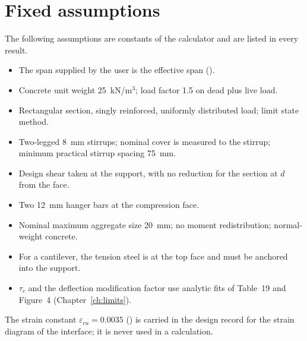 \section{Fixed assumptions}
The following assumptions are constants of the calculator and are listed in every result.
\begin{itemize}
  \item The span supplied by the user is the effective span ().
  \item Concrete unit weight 25~kN/m$^3$; load factor 1.5 on dead plus live load.
  \item Rectangular section, singly reinforced, uniformly distributed load; limit state method.
  \item Two-legged 8~mm stirrups; nominal cover is measured to the stirrup; minimum practical stirrup spacing 75~mm.
  \item Design shear taken at the support, with no reduction for the section at $d$ from the face.
  \item Two 12~mm hanger bars at the compression face.
  \item Nominal maximum aggregate size 20~mm; no moment redistribution; normal-weight concrete.
  \item For a cantilever, the tension steel is at the top face and must be anchored into the support.
  \item $\tau_c$ and the deflection modification factor use analytic fits of Table~19 and Figure~4 (Chapter~\ref{ch:limits}).
\end{itemize}
The strain constant $\varepsilon_{cu} = 0.0035$ () is carried in the design record for the strain diagram of the interface; it is never used in a calculation.
